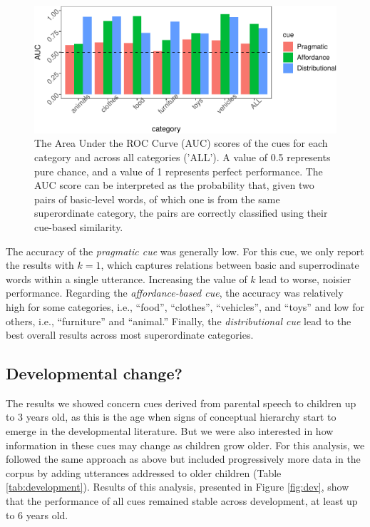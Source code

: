 \documentclass[english,,man,floatsintext]{apa6}
\begin{document}
\begin{figure}[h]

{\centering \includegraphics{cogsci_journal_files/figure-latex/data-all-1} 

}

\caption{\label{fig:data-all} The Area Under the ROC Curve (AUC) scores of the cues for each category and across all categories ('ALL'). A value of 0.5 represents pure chance, and a value of 1 represents perfect performance. The AUC score can be interpreted as the probability that, given two pairs of basic-level words, of which one is from the same superordinate category, the pairs are correctly classified using their  cue-based similarity.}\label{fig:data-all}
\end{figure}

The accuracy of the \emph{pragmatic cue} was generally low. For this cue, we only report the results with \(k=1\), which captures relations between basic and superrodinate words within a single utterance. Increasing the value of \(k\) lead to worse, noisier performance. Regarding the \emph{affordance-based cue}, the accuracy was relatively high for some categories, i.e., \enquote{food}, \enquote{clothes}, \enquote{vehicles}, and \enquote{toys} and low for others, i.e., \enquote{furniture} and \enquote{animal.} Finally, the \emph{distributional cue} lead to the best overall results across most superordinate categories.

\hypertarget{developmental-change}{%
\subsection{Developmental change?}\label{developmental-change}}

The results we showed concern cues derived from parental speech to children up to 3
years old, as this is the age when signs of conceptual hierarchy start
to emerge in the developmental literature. But we were also interested
in how information in these cues may change as children grow older.
For this analysis, we followed the same approach as above but included progressively more data in the corpus by adding utterances addressed to older children (Table \ref{tab:development}). Results of this analysis, presented in Figure \ref{fig:dev}, show that the performance of all cues remained stable across development, at least up to 6 years old.
\end{document}
